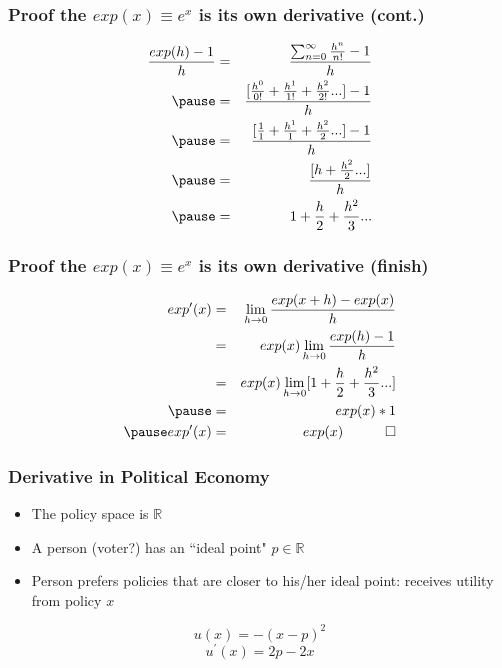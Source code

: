 \documentclass{beamer}
\numberwithin{equation}{section}
\begin{document}
\begin{frame}
\frametitle{Proof the $exp(x)\equiv e^x$ is its own derivative (cont.)}


\begin{eqnarray}
\frac{exp(h)-1}{h}&=&\frac{\sum_{n=0}^{\infty} \frac{h^n}{n!}-1}{h}\nonumber\\\pause
&=&\frac{[\frac{h^0}{0!}+\frac{h^1}{1!}+\frac{h^2}{2!}...]-1}{h}\nonumber\\\pause
&=&\frac{[\frac{1}{1}+\frac{h^1}{1}+\frac{h^2}{2}...]-1}{h}\nonumber\\\pause
&=&\frac{[h+\frac{h^2}{2}...]}{h}\nonumber\\\pause
&=&1+\frac{h}{2}+\frac{h^2}{3}...\nonumber
\end{eqnarray}


\end{frame}

\begin{frame}
\frametitle{Proof the $exp(x)\equiv e^x$ is its own derivative (finish)}



\begin{eqnarray}
exp'(x) &=& \lim_{h\rightarrow 0} \frac{exp(x+h)-exp(x)}{h} \nonumber\\
&=& exp(x)\lim_{h\rightarrow 0} \frac{exp(h)-1}{h}\nonumber\\
&=& exp(x)\lim_{h\rightarrow 0}[1+\frac{h}{2}+\frac{h^2}{3}...]\nonumber\\\pause
&=& exp(x)*1\nonumber\\ \pause
exp'(x)&=& exp(x)\quad \qed\nonumber
\end{eqnarray}

\end{frame}


\begin{frame}
\frametitle{Derivative in Political Economy}

\begin{itemize}
\item The policy space is $\mathbb{R}$ \pause
\item A person (voter?)  has an ``ideal point" $p\in \mathbb{R}$ \pause
\item Person prefers policies that are closer to his/her ideal point: receives utility  from policy $x$ 
\end{itemize}
$$u(x)=-(x-p)^2$$
$$u^\prime(x)=2p-2x$$

\end{frame}
\end{document}
